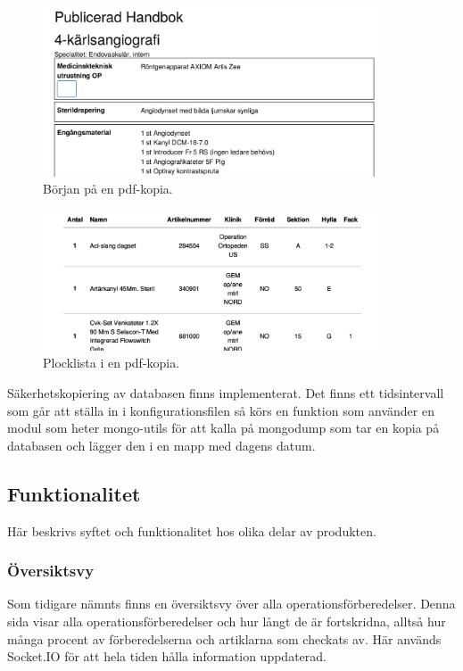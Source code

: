 \begin{figure}
  \centering
  \includegraphics[width=0.9\textwidth]{images/pdf-start.png}
  \caption{Början på en pdf-kopia.}
  \label{fig:pdf-start}
\end{figure}

\begin{figure}
  \centering
  \includegraphics[width=0.9\textwidth]{images/pdf-end.png}
  \caption{Plocklista i en pdf-kopia.}
  \label{fig:pdf-end}
\end{figure}

Säkerhetskopiering av databasen finns implementerat. Det finns ett tidsintervall som går att ställa in i konfigurationsfilen så körs en funktion som använder en modul som heter mongo-utils för att kalla på mongodump som tar en kopia på databasen och lägger den i en mapp med dagens datum. 

\subsection{Funktionalitet}
Här beskrivs syftet och funktionalitet hos olika delar av produkten.

\subsubsection{Översiktsvy}
Som tidigare nämnts finns en översiktsvy över alla operationsförberedelser.
Denna sida visar alla operationsförberedelser och hur långt de är fortskridna, alltså hur många procent av förberedelserna och artiklarna som checkats av.
Här används Socket.IO för att hela tiden hålla information uppdaterad.

